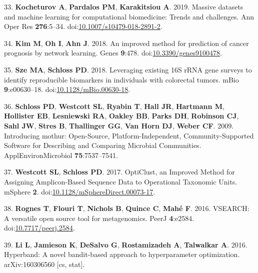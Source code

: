 \documentclass[11pt,]{article}
\begin{document}
\hypertarget{ref-kocheturov_massive_2019}{}
33. \textbf{Kocheturov A}, \textbf{Pardalos PM}, \textbf{Karakitsiou A}.
2019. Massive datasets and machine learning for computational
biomedicine: Trends and challenges. Ann Oper Res \textbf{276}:5--34.
doi:\href{https://doi.org/10.1007/s10479-018-2891-2}{10.1007/s10479-018-2891-2}.

\hypertarget{ref-kim_improved_2018}{}
34. \textbf{Kim M}, \textbf{Oh I}, \textbf{Ahn J}. 2018. An improved
method for prediction of cancer prognosis by network learning. Genes
\textbf{9}:478.
doi:\href{https://doi.org/10.3390/genes9100478}{10.3390/genes9100478}.

\hypertarget{ref-sze_leveraging_2018}{}
35. \textbf{Sze MA}, \textbf{Schloss PD}. 2018. Leveraging existing 16S
rRNA gene surveys to identify reproducible biomarkers in individuals
with colorectal tumors. mBio \textbf{9}:e00630--18.
doi:\href{https://doi.org/10.1128/mBio.00630-18}{10.1128/mBio.00630-18}.

\hypertarget{ref-schloss_introducing_2009}{}
36. \textbf{Schloss PD}, \textbf{Westcott SL}, \textbf{Ryabin T},
\textbf{Hall JR}, \textbf{Hartmann M}, \textbf{Hollister EB},
\textbf{Lesniewski RA}, \textbf{Oakley BB}, \textbf{Parks DH},
\textbf{Robinson CJ}, \textbf{Sahl JW}, \textbf{Stres B},
\textbf{Thallinger GG}, \textbf{Van Horn DJ}, \textbf{Weber CF}. 2009.
Introducing mothur: Open-Source, Platform-Independent,
Community-Supported Software for Describing and Comparing Microbial
Communities. ApplEnvironMicrobiol \textbf{75}:7537--7541.

\hypertarget{ref-westcott_opticlust_2017}{}
37. \textbf{Westcott SL}, \textbf{Schloss PD}. 2017. OptiClust, an
Improved Method for Assigning Amplicon-Based Sequence Data to
Operational Taxonomic Units. mSphere \textbf{2}.
doi:\href{https://doi.org/10.1128/mSphereDirect.00073-17}{10.1128/mSphereDirect.00073-17}.

\hypertarget{ref-rognes_vsearch_2016}{}
38. \textbf{Rognes T}, \textbf{Flouri T}, \textbf{Nichols B},
\textbf{Quince C}, \textbf{Mahé F}. 2016. VSEARCH: A versatile open
source tool for metagenomics. PeerJ \textbf{4}:e2584.
doi:\href{https://doi.org/10.7717/peerj.2584}{10.7717/peerj.2584}.

\hypertarget{ref-li_hyperband:_2016}{}
39. \textbf{Li L}, \textbf{Jamieson K}, \textbf{DeSalvo G},
\textbf{Rostamizadeh A}, \textbf{Talwalkar A}. 2016. Hyperband: A novel
bandit-based approach to hyperparameter optimization. arXiv:160306560
{[}cs, stat{]}.
\end{document}
